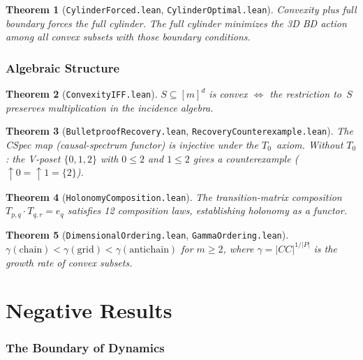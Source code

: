 \documentclass[11pt,a4paper]{article}
\newtheorem{theorem}{Theorem}[section]
\theoremstyle{remark}
\begin{document}
\begin{theorem}[\texttt{CylinderForced.lean}, \texttt{CylinderOptimal.lean}]
Convexity plus full boundary forces the full cylinder. The full cylinder
minimizes the 3D BD action among all convex subsets with those boundary conditions.
\end{theorem}

\section{Algebraic Structure}

\begin{theorem}[\texttt{ConvexityIFF.lean}]
$S \subseteq [m]^d$ is convex $\iff$ the restriction to~$S$ preserves
multiplication in the incidence algebra.
\end{theorem}

\begin{theorem}[\texttt{BulletproofRecovery.lean},
\texttt{RecoveryCounterexample.lean}]
The CSpec map (causal-spectrum functor) is injective under the $T_0$~axiom.
Without $T_0$: the V-poset $\{0,1,2\}$ with $0 \leq 2$ and $1 \leq 2$
gives a counterexample ($\uparrow 0 = \uparrow 1 = \{2\}$).
\end{theorem}

\begin{theorem}[\texttt{HolonomyComposition.lean}]
The transition-matrix composition $T_{p,q} \cdot T_{q,r} = e_q$ satisfies
12 composition laws, establishing holonomy as a functor.
\end{theorem}

\begin{theorem}[\texttt{DimensionalOrdering.lean},
\texttt{GammaOrdering.lean}]
$\gamma(\text{chain}) < \gamma(\text{grid}) < \gamma(\text{antichain})$ for
$m \geq 2$, where $\gamma = |CC|^{1/|P|}$ is the growth rate of convex subsets.
\end{theorem}

\part{Negative Results}

\section{The Boundary of Dynamics}\label{sec:negative}
\end{document}

